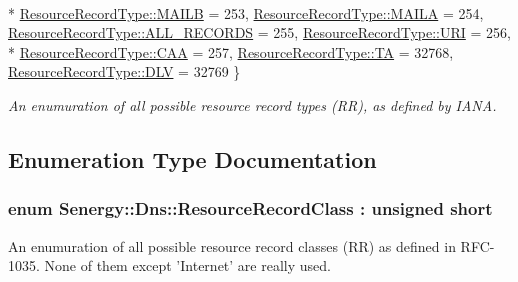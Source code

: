 \begin{DoxyCompactItemize}
\\*
\hyperlink{namespace_senergy_1_1_dns_a590bfd748c955364770f5ce358d9dfe0ae599722792c31154f99048e56b9cf384}{Resource\-Record\-Type\-::\-M\-A\-I\-L\-B} = 253, 
\hyperlink{namespace_senergy_1_1_dns_a590bfd748c955364770f5ce358d9dfe0a59fe37d7dd88b5a7c76146d14db1331f}{Resource\-Record\-Type\-::\-M\-A\-I\-L\-A} = 254, 
\hyperlink{namespace_senergy_1_1_dns_a590bfd748c955364770f5ce358d9dfe0a8261d4e71736b8ae72eae60ff8e18191}{Resource\-Record\-Type\-::\-A\-L\-L\-\_\-\-R\-E\-C\-O\-R\-D\-S} = 255, 
\hyperlink{namespace_senergy_1_1_dns_a590bfd748c955364770f5ce358d9dfe0a8447306210a0972ac94b7d774799df1a}{Resource\-Record\-Type\-::\-U\-R\-I} = 256, 
\\*
\hyperlink{namespace_senergy_1_1_dns_a590bfd748c955364770f5ce358d9dfe0ad7ff895c2bd9c10f958833aeb0289ad4}{Resource\-Record\-Type\-::\-C\-A\-A} = 257, 
\hyperlink{namespace_senergy_1_1_dns_a590bfd748c955364770f5ce358d9dfe0a890a10788493e3d572586e991cd43543}{Resource\-Record\-Type\-::\-T\-A} = 32768, 
\hyperlink{namespace_senergy_1_1_dns_a590bfd748c955364770f5ce358d9dfe0aede320f6102f02f5903553674ed8a3f5}{Resource\-Record\-Type\-::\-D\-L\-V} = 32769
 \}
\begin{DoxyCompactList}\small\item\em An enumuration of all possible resource record types (R\-R), as defined by I\-A\-N\-A. \end{DoxyCompactList}\end{DoxyCompactItemize}


\subsection{Enumeration Type Documentation}
\hypertarget{namespace_senergy_1_1_dns_a953f153bc411213d621d00c1e1b3eb9d}{
\subsubsection[{Resource\-Record\-Class}]{\setlength{\rightskip}{0pt plus 5cm}enum {\bf Senergy\-::\-Dns\-::\-Resource\-Record\-Class} \-: unsigned short\hspace{0.3cm}{\ttfamily [strong]}}}\label{namespace_senergy_1_1_dns_a953f153bc411213d621d00c1e1b3eb9d}


An enumuration of all possible resource record classes (R\-R) as defined in R\-F\-C-\/1035. None of them except 'Internet' are really used. 

